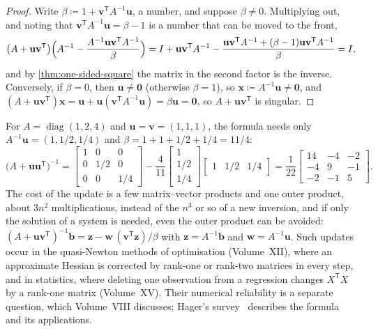 \begin{proof}
Write $\beta\coloneqq1+\mathbf v^{\mathsf T}A^{-1}\mathbf u$, a number, and suppose $\beta\ne0$. Multiplying out, and noting that $\mathbf v^{\mathsf T}A^{-1}\mathbf u=\beta-1$ is a number that can be moved to the front,
\[
\bigl(A+\mathbf u\mathbf v^{\mathsf T}\bigr)\Bigl(A^{-1}-\frac{A^{-1}\mathbf u\mathbf v^{\mathsf T}A^{-1}}\beta\Bigr)=I+\mathbf u\mathbf v^{\mathsf T}A^{-1}-\frac{\mathbf u\mathbf v^{\mathsf T}A^{-1}+(\beta-1)\mathbf u\mathbf v^{\mathsf T}A^{-1}}\beta=I,
\]
and by \cref{thm:one-sided-square} the matrix in the second factor is the inverse. Conversely, if $\beta=0$, then $\mathbf u\ne\mathbf 0$ (otherwise $\beta=1$), so $\mathbf x\coloneqq A^{-1}\mathbf u\ne\mathbf 0$, and $(A+\mathbf u\mathbf v^{\mathsf T})\mathbf x=\mathbf u+\mathbf u(\mathbf v^{\mathsf T}A^{-1}\mathbf u)=\beta\mathbf u=\mathbf 0$, so $A+\mathbf u\mathbf v^{\mathsf T}$ is singular.
\end{proof}

For $A=\operatorname{diag}(1,2,4)$ and $\mathbf u=\mathbf v=(1,1,1)$, the formula needs only $A^{-1}\mathbf u=(1,1/2,1/4)$ and $\beta=1+1+1/2+1/4=11/4$:
\[
\bigl(A+\mathbf u\mathbf u^{\mathsf T}\bigr)^{-1}=\begin{bmatrix}1&0&0\\0&1/2&0\\0&0&1/4\end{bmatrix}-\frac4{11}\begin{bmatrix}1\\1/2\\1/4\end{bmatrix}\begin{bmatrix}1&1/2&1/4\end{bmatrix}=\frac1{22}\begin{bmatrix}14&-4&-2\\-4&9&-1\\-2&-1&5\end{bmatrix}.
\]
The cost of the update is a few matrix--vector products and one outer product, about $3n^2$ multiplications, instead of the $n^3$ or so of a new inversion, and if only the solution of a system is needed, even the outer product can be avoided: $(A+\mathbf u\mathbf v^{\mathsf T})^{-1}\mathbf b=\mathbf z-\mathbf w\,(\mathbf v^{\mathsf T}\mathbf z)/\beta$ with $\mathbf z=A^{-1}\mathbf b$ and $\mathbf w=A^{-1}\mathbf u$. Such updates occur in the quasi-Newton methods of optimisation (Volume~XII), where an approximate Hessian is corrected by rank-one or rank-two matrices in every step, and in statistics, where deleting one observation from a regression changes $X^{\mathsf T}X$ by a rank-one matrix (Volume~XV). Their numerical reliability is a separate question, which Volume~VIII discusses; Hager's survey~\cite{hager1989} describes the formula and its applications.

